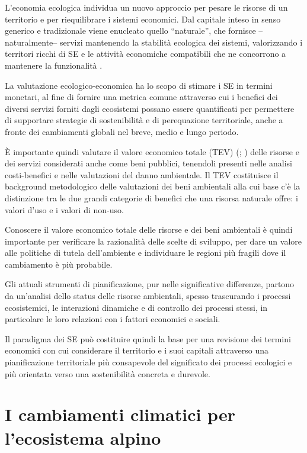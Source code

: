 \documentclass[14pt,a4paper]{article}
\begin{document}
	L'economia ecologica individua un nuovo approccio per pesare le risorse di un territorio e per riequilibrare i sistemi economici. Dal capitale inteso in senso generico e tradizionale viene enucleato quello ``naturale'', che fornisce --naturalmente-- servizi mantenendo la stabilità ecologica dei sistemi, valorizzando i territori ricchi di SE e le attività economiche compatibili che ne concorrono a mantenere la funzionalità \cite{SE_e_Sostenibilita}. 
	
	La valutazione ecologico-economica ha lo scopo di stimare i SE in termini monetari, al fine di fornire una metrica comune	attraverso cui i benefici dei diversi servizi forniti dagli ecosistemi possano essere quantificati \cite{MEA_EcosystemsAndHumanWellBeing:Synthesis} per permettere di supportare strategie di sostenibilità e di perequazione territoriale, anche a fronte dei cambiamenti globali nel breve, medio e lungo periodo. 
	
	È importante quindi valutare il valore economico totale (TEV) (\cite{freeman2014measurement}; \cite{merlo2005valuing}) delle risorse e dei servizi considerati anche come beni pubblici, tenendoli presenti nelle analisi costi-benefici e nelle valutazioni del danno ambientale. Il TEV costituisce il background metodologico delle valutazioni dei beni ambientali alla cui base c'è la distinzione tra le due grandi categorie di benefici che una risorsa naturale offre: i valori d'uso e i valori di non-uso.  
	
	Conoscere il valore economico totale delle risorse e dei beni ambientali è quindi importante per verificare la razionalità delle scelte di sviluppo, per dare un valore alle politiche di tutela dell'ambiente e individuare le regioni più fragili dove il cambiamento è più probabile. 
	
	Gli attuali strumenti di pianificazione, pur nelle significative differenze, partono da un'analisi dello status delle risorse ambientali, spesso trascurando i processi ecosistemici, le interazioni dinamiche e di controllo dei processi stessi, in particolare le loro relazioni con i fattori economici e sociali. 
	
	Il paradigma dei SE può costituire quindi la base per una revisione dei termini economici con cui considerare il territorio e i suoi capitali attraverso una  pianificazione territoriale più consapevole del significato dei processi ecologici e più orientata verso una sostenibilità concreta e durevole.
	
	
	\section{I cambiamenti climatici per l'ecosistema alpino}
	
\end{document}
